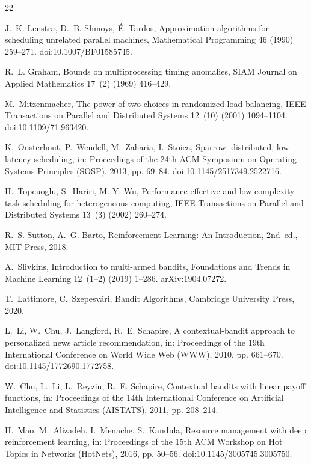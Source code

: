 \documentclass[final,5p,times,twocolumn]{elsarticle}
\begin{document}
\begin{thebibliography}{22}

 J.~K. Lenstra, D.~B. Shmoys, \'E. Tardos, Approximation algorithms for scheduling unrelated parallel machines, Mathematical Programming 46 (1990) 259--271. doi:10.1007/BF01585745.

 R.~L. Graham, Bounds on multiprocessing timing anomalies, SIAM Journal on Applied Mathematics 17~(2) (1969) 416--429.

 M.~Mitzenmacher, The power of two choices in randomized load balancing, IEEE Transactions on Parallel and Distributed Systems 12~(10) (2001) 1094--1104. doi:10.1109/71.963420.

 K.~Ousterhout, P.~Wendell, M.~Zaharia, I.~Stoica, Sparrow: distributed, low latency scheduling, in: Proceedings of the 24th ACM Symposium on Operating Systems Principles (SOSP), 2013, pp. 69--84. doi:10.1145/2517349.2522716.

 H.~Topcuoglu, S.~Hariri, M.-Y. Wu, Performance-effective and low-complexity task scheduling for heterogeneous computing, IEEE Transactions on Parallel and Distributed Systems 13~(3) (2002) 260--274.

 R.~S. Sutton, A.~G. Barto, Reinforcement Learning: An Introduction, 2nd~ed., MIT Press, 2018.

 A.~Slivkins, Introduction to multi-armed bandits, Foundations and Trends in Machine Learning 12~(1--2) (2019) 1--286. arXiv:1904.07272.

 T.~Lattimore, C.~Szepesv\'ari, Bandit Algorithms, Cambridge University Press, 2020.

 L.~Li, W.~Chu, J.~Langford, R.~E. Schapire, A contextual-bandit approach to personalized news article recommendation, in: Proceedings of the 19th International Conference on World Wide Web (WWW), 2010, pp. 661--670. doi:10.1145/1772690.1772758.

 W.~Chu, L.~Li, L.~Reyzin, R.~E. Schapire, Contextual bandits with linear payoff functions, in: Proceedings of the 14th International Conference on Artificial Intelligence and Statistics (AISTATS), 2011, pp. 208--214.

 H.~Mao, M.~Alizadeh, I.~Menache, S.~Kandula, Resource management with deep reinforcement learning, in: Proceedings of the 15th ACM Workshop on Hot Topics in Networks (HotNets), 2016, pp. 50--56. doi:10.1145/3005745.3005750.


\end{thebibliography}
\end{document}
